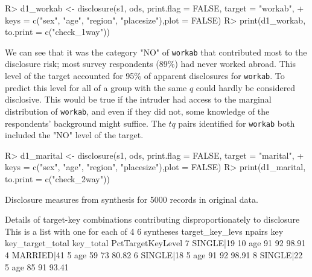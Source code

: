 \documentclass[12pt]{article}
\renewcommand{\baselinestretch}{1.5} %
\begin{document}
\begin{Schunk}
\begin{Sinput}
R> d1_workab <- disclosure(s1, ods, print.flag = FALSE, target = "workab",
+     keys = c("sex", "age", "region", "placesize"),plot = FALSE)
R> print(d1_workab, to.print = c("check_1way"))
\end{Sinput}
\end{Schunk}
\renewcommand{\baselinestretch}{1.5}
We can see that it was the category "NO" of \texttt{workab} that contributed most to the
disclosure risk; most survey respondents (89\%) had never worked abroad. This level of
the target accounted for 95\% of apparent disclosures for \texttt{workab}. To
predict this level for all of a group with the same $q$ could hardly be considered 
disclosive. This would be true if the intruder had access to the marginal distribution
of \texttt{workab}, and even if they did not, some knowledge of the respondents' background
might suffice. The $tq$ pairs identified for \texttt{workab} both included the "NO"
level of the target.
\renewcommand{\baselinestretch}{1.0}
\begin{Schunk}
\begin{Sinput}
R> d1_marital <- disclosure(s1, ods, print.flag = FALSE, target = "marital",
+     keys = c("sex", "age", "region", "placesize"),plot = FALSE)
R> print(d1_marital, to.print = c("check_2way"))
\end{Sinput}
\begin{Soutput}
Disclosure measures from synthesis for 5000 records in original data.

Details of target-key combinations contributing disproportionately to disclosure
This is a list with one for each of 4 6 syntheses
  target_key_levs npairs key key_target_total key_total PctTargetKeyLevel
7       SINGLE|19     10 age               91        92             98.91
4      MARRIED|41      5 age               59        73             80.82
6       SINGLE|18      5 age               91        92             98.91
8       SINGLE|22      5 age               85        91             93.41
\end{Soutput}
\end{Schunk}
\end{document}
